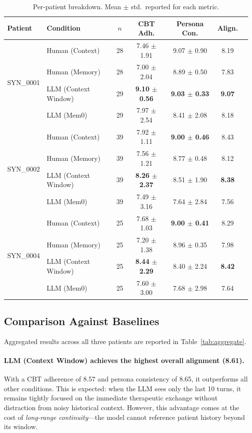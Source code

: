 \documentclass{article} %
\begin{document}
\begin{table}[h]
\centering
\caption{Per-patient breakdown. Mean $\pm$ std.\ reported for each metric.}
\label{tab:perpatient}
\small
\begin{tabular}{llccccc}
\toprule
\textbf{Patient} & \textbf{Condition} & $n$ & \textbf{CBT Adh.} & \textbf{Persona Con.} & \textbf{Align.} \\
\midrule
\multirow{4}{*}{SYN\_0001}
 & Human (Context) & 28 & 7.46 $\pm$ 1.91 & 9.07 $\pm$ 0.90 & 8.19 \\
 & Human (Memory) & 28 & 7.00 $\pm$ 2.04 & 8.89 $\pm$ 0.50 & 7.83 \\
 & LLM (Context Window) & 29 & \textbf{9.10 $\pm$ 0.56} & \textbf{9.03 $\pm$ 0.33} & \textbf{9.07} \\
 & LLM (Mem0) & 29 & 7.97 $\pm$ 2.54 & 8.41 $\pm$ 2.08 & 8.18 \\
\midrule
\multirow{4}{*}{SYN\_0002}
 & Human (Context) & 39 & 7.92 $\pm$ 1.11 & \textbf{9.00 $\pm$ 0.46} & 8.43 \\
 & Human (Memory) & 39 & 7.56 $\pm$ 1.21 & 8.77 $\pm$ 0.48 & 8.12 \\
 & LLM (Context Window) & 39 & \textbf{8.26 $\pm$ 2.37} & 8.51 $\pm$ 1.90 & \textbf{8.38} \\
 & LLM (Mem0) & 39 & 7.49 $\pm$ 3.16 & 7.64 $\pm$ 2.84 & 7.56 \\
\midrule
\multirow{4}{*}{SYN\_0004}
 & Human (Context) & 25 & 7.68 $\pm$ 1.03 & \textbf{9.00 $\pm$ 0.41} & 8.29 \\
 & Human (Memory) & 25 & 7.20 $\pm$ 1.38 & 8.96 $\pm$ 0.35 & 7.98 \\
 & LLM (Context Window) & 25 & \textbf{8.44 $\pm$ 2.29} & 8.40 $\pm$ 2.24 & \textbf{8.42} \\
 & LLM (Mem0) & 25 & 7.60 $\pm$ 3.00 & 7.68 $\pm$ 2.98 & 7.64 \\
\bottomrule
\end{tabular}
\end{table}

\subsection{Comparison Against Baselines}

Aggregated results across all three patients are reported in Table~\ref{tab:aggregate}.

\paragraph{LLM (Context Window) achieves the highest overall alignment (8.61).} With a CBT adherence of 8.57 and persona consistency of 8.65, it outperforms all other conditions. This is expected: when the LLM sees only the last 10 turns, it remains tightly focused on the immediate therapeutic exchange without distraction from noisy historical context. However, this advantage comes at the cost of \emph{long-range continuity}---the model cannot reference patient history beyond its window.
\end{document}
